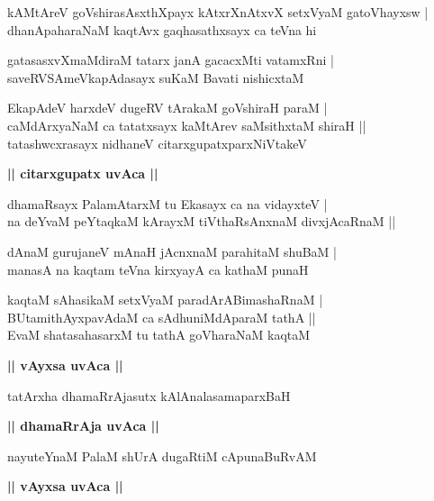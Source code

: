 \documentclass[twoside,12pt,openright]{book}
\newcounter{shloka}[chapter]
\def\uvaca#1{\centerline{{\large\textbf{#1}}}}
\begin{document}
\begin{shloka}%
kAMtAreV goVshirasAsxthXpayx kAtxrXnAtxvX setxVyaM gatoVhayxsw |\\
dhanApaharaNaM kaqtAvx gaqhasathxsayx ca teVna hi
\end{shloka}

\begin{shloka}%
gatasasxvXmaMdiraM tatarx janA gacacxMti vatamxRni |\\
saveRVSAmeVkapAdasayx suKaM Bavati nishicxtaM 
\end{shloka}

\begin{shloka}%
EkapAdeV harxdeV dugeRV tArakaM goVshiraH paraM |\\
caMdArxyaNaM ca tatatxsayx kaMtArev saMsithxtaM shiraH ||\\
tatashwcxrasayx nidhaneV citarxgupatxparxNiVtakeV
\end{shloka}

\uvaca{|| citarxgupatx uvAca ||}

\begin{shloka}%
dhamaRsayx PalamAtarxM tu Ekasayx ca na vidayxteV |\\
na deYvaM peYtaqkaM kArayxM tiVthaRsAnxnaM divxjAcaRnaM ||
\end{shloka}

\begin{shloka}%
dAnaM gurujaneV mAnaH jAcnxnaM parahitaM shuBaM |\\
manasA na kaqtam teVna kirxyayA ca kathaM punaH 
\end{shloka}

\begin{shloka}%
kaqtaM sAhasikaM setxVyaM paradArABimashaRnaM |\\
BUtamithAyxpavAdaM ca sAdhuniMdAparaM tathA ||\\
EvaM shatasahasarxM tu tathA goVharaNaM kaqtaM 
\end{shloka}

\uvaca{|| vAyxsa uvAca ||}

\begin{shloka}%
tatArxha dhamaRrAjasutx kAlAnalasamaparxBaH 
\end{shloka}

\uvaca{|| dhamaRrAja uvAca ||}

\begin{shloka}%
nayuteYnaM PalaM shUrA dugaRtiM cApunaBuRvAM 
\end{shloka}

\uvaca{|| vAyxsa uvAca ||}
\end{document}
